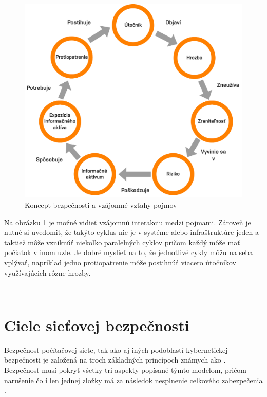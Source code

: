 	\begin{figure}[!h]
	\begin{center}
		\includegraphics[scale=0.5]{obrazky/sec_cycle.pdf}
	\end{center}
	\caption[Koncept bezpečnosti a vzájomné vzťahy pojmov]{Koncept bezpečnosti a vzájomné vzťahy pojmov \cite{McMillan2018}}
	\label{sec-cycle}
	\end{figure}

Na obrázku \ref{sec-cycle} je možné vidieť vzájomnú interakciu medzi pojmami. Zároveň je nutné si uvedomiť, že takýto cyklus nie je v systéme alebo infraštruktúre jeden a taktiež môže vzniknúť niekoľko paralelných cyklov pričom každý môže mať počiatok v inom uzle. Je dobré myslieť na to, že jednotlivé cykly môžu na seba vplývať, napríklad jedno protiopatrenie môže postihnúť viacero útočníkov využívajúcich rôzne hrozby. 

\


\section{Ciele sieťovej bezpečnosti}
Bezpečnosť počítačovej siete, tak ako aj iných podoblastí kybernetickej bezpečnosti je založená na troch základných princípoch známych ako . Bezpečnosť musí pokryť všetky tri aspekty popísané týmto modelom, pričom narušenie čo i len jednej zložky má za následok nesplnenie celkového zabezpečenia \cite{Vyncke2008}. 

